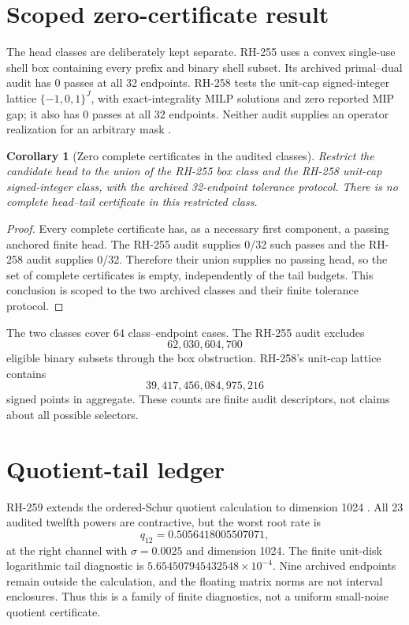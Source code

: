 \documentclass[11pt]{article}
\newtheorem{corollary}[theorem]{Corollary}
\theoremstyle{definition}
\theoremstyle{remark}
\begin{document}
\section{Scoped zero-certificate result}

The head classes are deliberately kept separate.  RH-255 uses a convex
single-use shell box containing every prefix and binary shell subset.  Its
archived primal--dual audit has 0 passes at all 32 endpoints.  RH-258 tests the
unit-cap signed-integer lattice $\{-1,0,1\}^J$, with exact-integrality MILP
solutions and zero reported MIP gap; it also has 0 passes at all 32 endpoints.
Neither audit supplies an operator realization for an arbitrary mask
\citep{WangRH255,WangRH258}.

\begin{corollary}[Zero complete certificates in the audited classes]
\label{cor:zero}
Restrict the candidate head to the union of the RH-255 box class and the
RH-258 unit-cap signed-integer class, with the archived 32-endpoint tolerance
protocol.  There is no complete head--tail certificate in this restricted
class.
\end{corollary}

\begin{proof}
Every complete certificate has, as a necessary first component, a passing
anchored finite head.  The RH-255 audit supplies 0/32 such passes and the
RH-258 audit supplies 0/32.  Therefore their union supplies no passing head,
so the set of complete certificates is empty, independently of the tail
budgets.  This conclusion is scoped to the two archived classes and their
finite tolerance protocol.
\end{proof}

The two classes cover 64 class--endpoint cases.  The RH-255 audit excludes
\[
 62{,}030{,}604{,}700
\]
eligible binary subsets through the box obstruction.  RH-258's unit-cap
lattice contains
\[
 39{,}417{,}456{,}084{,}975{,}216
\]
signed points in aggregate.  These counts are finite audit descriptors, not
claims about all possible selectors.

\section{Quotient-tail ledger}

RH-259 extends the ordered-Schur quotient calculation to dimension 1024
\citep{WangRH246,WangRH259}.  All
23 audited twelfth powers are contractive, but the worst root rate is
\[
 q_{12}=0.5056418005507071,
\]
at the right channel with $\sigma=0.0025$ and dimension 1024.  The finite
unit-disk logarithmic tail diagnostic is
$5.654507945432548\times10^{-4}$.  Nine archived endpoints remain outside
the calculation, and the floating matrix norms are not interval enclosures.
Thus this is a family of finite diagnostics, not a uniform small-noise
quotient certificate.
\end{document}
